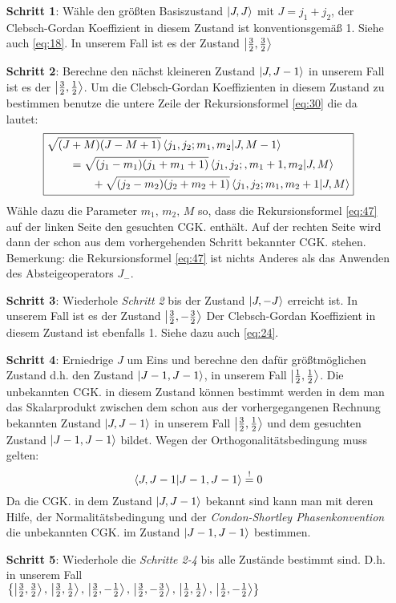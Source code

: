 \begin{itemize}
\item[\textbf{Schritt 1}:] Wähle den größten Basiszustand \(\left| J,J \right\rangle\) mit \(J=j_1+j_2\), der
  Clebsch-Gordan Koeffizient in diesem Zustand ist konventionsgemäß 1. Siehe
auch \eqref{eq:18}. In unserem Fall ist es der Zustand \(\left| \frac 3 2, \frac 3
2 \right\rangle\)
\item[\textbf{Schritt 2}:] Berechne den nächst kleineren Zustand \(\left| J, J-1 \right\rangle\) in
  unserem Fall ist es der \(\left| \frac 3 2, \frac 1 2 \right\rangle\). Um die Clebsch-Gordan
  Koeffizienten in diesem Zustand zu bestimmen benutze die untere Zeile der
  Rekursionsformel \eqref{eq:30} die da lautet:
  \begin{equation}
    \label{eq:47}
    \boxed{
    \begin{split}
      &\sqrt{(J+ M)
        (J- M+1)}\braket{j_1,j_2;m_1,m_2}{J,M- 1}\\
      &\qquad
      = \sqrt{(j_1- m_1)(j_1+m_1+1)}
      \braket{j_1,j_2;,m_1+ 1,m_2}{J,M}\\
      &\qquad\qquad
      +\sqrt{(j_2- m_2)(j_2+ m_2+1)}
      \braket{j_1,j_2;m_1,m_2+ 1}{J,M}
    \end{split}}
  \end{equation}
Wähle dazu die Parameter \(m_1,\, m_2,\, M\) so, dass die Rekursionsformel
\eqref{eq:47} auf der linken Seite den gesuchten CGK. enthält. Auf der rechten
Seite wird dann der schon aus dem vorhergehenden Schritt bekannter CGK. stehen.
Bemerkung: die Rekursionsformel \eqref{eq:47} ist nichts Anderes als das
Anwenden des Absteigeoperators \(J_-\).
\item[\textbf{Schritt 3}:] Wiederhole \emph{Schritt 2} bis der Zustand
  \(\left| J,-J \right\rangle\) erreicht ist. In unserem Fall ist es der Zustand \(\left| \frac 3
  2, -\frac 3 2 \right\rangle\) Der Clebsch-Gordan Koeffizient in diesem Zustand
  ist ebenfalls 1. Siehe dazu auch \eqref{eq:24}.
\item[\textbf{Schritt 4}:] Erniedrige \(J\) um Eins und berechne den dafür
  größtmöglichen Zustand d.h. den Zustand \(\left| J-1,J-1 \right\rangle\), in unserem Fall
  \(\left| \frac 1 2, \frac 1 2 \right\rangle\). Die unbekannten CGK. in diesem Zustand können
  bestimmt werden in dem man das Skalarprodukt zwischen dem schon aus der
  vorhergegangenen Rechnung bekannten Zustand \(\left| J,J-1 \right\rangle\) in unserem Fall
  \(\left| \frac 3 2, \frac 1 2 \right\rangle\) und dem gesuchten  Zustand \(\left| J-1,J-1 \right\rangle\)
  bildet. Wegen der Orthogonalitätsbedingung muss gelten:
  \begin{equation}
    \label{eq:48}
    \braket{J,J-1}{J-1,J-1}\stackrel{!}=0
  \end{equation}
  Da die CGK. in dem Zustand \(\left| J,J-1 \right\rangle\) bekannt sind kann man mit deren Hilfe,
  der Normalitätsbedingung und der \emph{Condon-Shortley Phasenkonvention} die
  unbekannten CGK. im Zustand \(\left| J-1,J-1 \right\rangle\) bestimmen.
\item[\textbf{Schritt 5}:] Wiederhole die \emph{Schritte 2-4} bis alle Zustände
  bestimmt sind. D.h. in unserem Fall\\
 \(\left\{\left| \frac 3 2, \frac 3 2 \right\rangle,\,\left| \frac 3 2,
    \frac 1 2 \right\rangle,\,\left| \frac 3 2, -\frac 1 2 \right\rangle,\, \left| \frac 3 2, -\frac 3
    2 \right\rangle,\,\left| \frac 1 2, \frac 1 2 \right\rangle,\,\left| \frac 1 2, -\frac 1 2 \right\rangle \right\}\)
\end{itemize}

